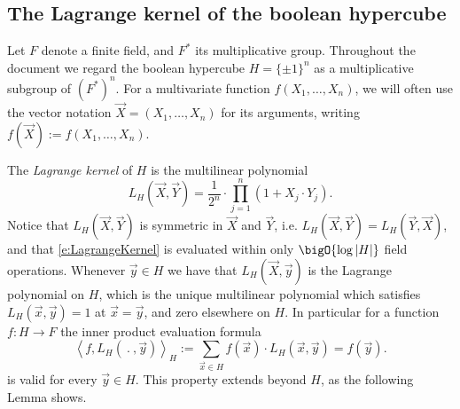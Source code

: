 \documentclass[11pt]{article}
\theoremstyle{definition}
\theoremstyle{remark}
\begin{document}
\subsection{The Lagrange kernel of the boolean hypercube}

Let $F$ denote a finite field, and $F^*$ its multiplicative group.
Throughout the document we regard the boolean hypercube $H= \{\pm 1\}^n$  as a multiplicative subgroup of  $(F^*)^n$.
For a multivariate function $f(X_1,\ldots, X_n)$, we will often use the vector notation $\vec X = (X_1,\ldots, X_n)$ for its arguments, writing $f(\vec X) := f(X_1,\ldots, X_n)$.
 

The \textit{Lagrange kernel} of $H$ is the multilinear polynomial
\begin{equation}
\label{e:LagrangeKernel}
L_H(\vec X, \vec Y)  = \frac{1}{2^n}\cdot \prod_{j=1}^n (1 + X_j\cdot Y_j).
\end{equation}
Notice that $L_H(\vec X, \vec Y)$ is symmetric in $\vec X$ and $\vec Y$, i.e. $L_H(\vec X, \vec Y)=L_H(\vec Y, \vec X)$, and that \eqref{e:LagrangeKernel} is evaluated within only $\bigO{\log|H|}$ field operations.
Whenever $\vec y \in H$ we have that $L_H(\vec X, \vec y)$ is the Lagrange polynomial on $H$, which is the unique multilinear polynomial which satisfies $L_H(\vec x, \vec y) = 1$ at $\vec x = \vec y$, and zero elsewhere on $H$.
In particular for a function $f: H\rightarrow F$  the inner product evaluation formula 
\[
\left\langle f ,L_H(\:.\:, \vec y)\right\rangle_H := \sum_{\vec x\in H} f(\vec x) \cdot L_H(\vec x, \vec y) = f(\vec y).
\]
is valid for every $\vec y\in H$.
This property extends beyond $H$, as the following Lemma shows.
\end{document}
